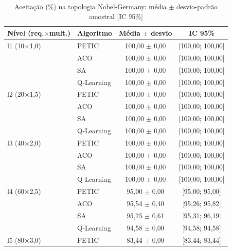 \begin{table}[htb]
    \centering
    \small
    \caption{Aceitação (\%) na topologia Nobel-Germany: média $\pm$ desvio-padrão amostral [IC 95\%]}
    \label{tab:aceitacao-nobel-germany}
    \begin{tabular}{llcc}
        \hline
        Nível (req.$\times$mult.) & Algoritmo & Média $\pm$ desvio & IC 95\% \\
        \hline
        l1 (10$\times$1,0) & PETIC & 100,00 $\pm$ 0,00 & [100,00; 100,00] \\
         & ACO & 100,00 $\pm$ 0,00 & [100,00; 100,00] \\
         & SA & 100,00 $\pm$ 0,00 & [100,00; 100,00] \\
         & Q-Learning & 100,00 $\pm$ 0,00 & [100,00; 100,00] \\
        \hline
        l2 (20$\times$1,5) & PETIC & 100,00 $\pm$ 0,00 & [100,00; 100,00] \\
         & ACO & 100,00 $\pm$ 0,00 & [100,00; 100,00] \\
         & SA & 100,00 $\pm$ 0,00 & [100,00; 100,00] \\
         & Q-Learning & 100,00 $\pm$ 0,00 & [100,00; 100,00] \\
        \hline
        l3 (40$\times$2,0) & PETIC & 100,00 $\pm$ 0,00 & [100,00; 100,00] \\
         & ACO & 100,00 $\pm$ 0,00 & [100,00; 100,00] \\
         & SA & 100,00 $\pm$ 0,00 & [100,00; 100,00] \\
         & Q-Learning & 100,00 $\pm$ 0,00 & [100,00; 100,00] \\
        \hline
        l4 (60$\times$2,5) & PETIC & 95,00 $\pm$ 0,00 & [95,00; 95,00] \\
         & ACO & 95,54 $\pm$ 0,40 & [95,26; 95,82] \\
         & SA & 95,75 $\pm$ 0,61 & [95,31; 96,19] \\
         & Q-Learning & 94,58 $\pm$ 0,00 & [94,58; 94,58] \\
        \hline
        l5 (80$\times$3,0) & PETIC & 83,44 $\pm$ 0,00 & [83,44; 83,44] \\

\end{tabular}
\end{table}
